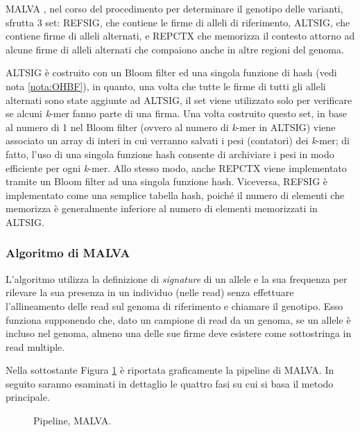 \documentclass[../main.tex]{subfiles}
\begin{document}
MALVA , nel corso del procedimento per determinare il genotipo delle varianti, sfrutta 3 set: REFSIG, che contiene le firme di alleli di riferimento, ALTSIG, che contiene firme di alleli alternati, e REPCTX che memorizza il contesto attorno ad alcune firme di alleli alternati che compaiono anche in altre regioni del genoma.

ALTSIG è costruito con un Bloom filter ed una singola funzione di hash (vedi nota \vref{nota:OHBF}), in quanto, una volta che tutte le firme di tutti gli alleli alternati sono state aggiunte ad ALTSIG, il set viene utilizzato solo per verificare se alcuni \textit{k}-mer fanno parte di una firma. Una volta costruito questo set, in base al numero di 1 nel Bloom filter (ovvero al numero di \textit{k}-mer in ALTSIG) viene associato un array di interi in cui verranno salvati i pesi (contatori) dei \textit{k}-mer; di fatto, l'uso di una singola funzione hash consente di archiviare i pesi in modo efficiente per ogni \textit{k}-mer. Allo stesso modo, anche REPCTX viene implementato tramite un Bloom filter ad una singola funzione hash. Viceversa, REFSIG è implementato come una semplice tabella hash, poiché il numero di elementi che memorizza è generalmente inferiore al numero di elementi memorizzati in ALTSIG. 


\subsubsection{Algoritmo di MALVA}

L'algoritmo utilizza la definizione di \textit{signature} di un allele e la sua frequenza per rilevare la sua presenza in un individuo (nelle read) senza effettuare l'allineamento delle read sul genoma di riferimento e chiamare il genotipo. Esso funziona supponendo che, dato un campione di read da un genoma, se un allele è incluso nel genoma, almeno una delle sue firme deve esistere come sottostringa in read multiple.

Nella sottostante Figura \ref{fig:malva} è riportata graficamente la pipeline di MALVA. In seguito saranno esaminati in dettaglio le quattro fasi su cui si basa il metodo principale.

 \begin{figure}[h!]
	\centering
  	\captionsetup{justification=centering}
  	\caption{Pipeline, MALVA.}
  	\label{fig:malva}
\end{figure}
\end{document}
